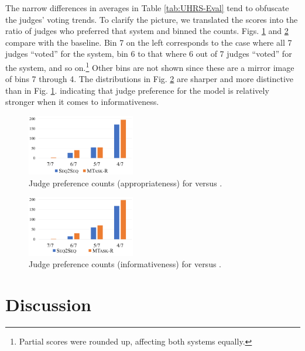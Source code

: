 \documentclass[letterpaper]{article}
\begin{document}
The narrow differences in averages in Table \ref{tab:UHRS-Eval} tend to obfuscate the judges' voting trends. 
To clarify the picture, we translated the scores into the ratio of judges who preferred that system and binned the counts.  
Figs. \ref{fig:mem-tweets-app} and \ref{fig:mem-tweets-inf} compare \MTaskR with the \sts baseline. 
Bin 7 on the left corresponds to the case where all 7 judges ``voted'' for the system, bin 6 to that where 6 out of 7 judges ``voted'' for the system, and so on.\footnote{Partial scores were rounded up,  affecting both systems equally.} 
Other bins are not shown since these are a mirror image of bins 7 through 4. 
The distributions in Fig. \ref{fig:mem-tweets-inf} are sharper and more distinctive than in  Fig. \ref{fig:mem-tweets-app}. indicating that judge preference for the \MTaskR model is relatively stronger when it comes to informativeness. 
 
\begin{figure}
\centering 
\includegraphics[width=0.42\textwidth]{mem-tweets-app-emb.pdf}
\caption{Judge preference counts (appropriateness) for \MTaskR versus \sts.} 
\label{fig:mem-tweets-app}
\end{figure}
 
\begin{figure}
\centering 
\includegraphics[width=0.42\textwidth]{mem-tweets-inf-emb.pdf}
\caption{Judge preference counts (informativeness) for \MTaskR versus \sts.} 
\label{fig:mem-tweets-inf}
\end{figure}
 
\section{Discussion}
\end{document}
